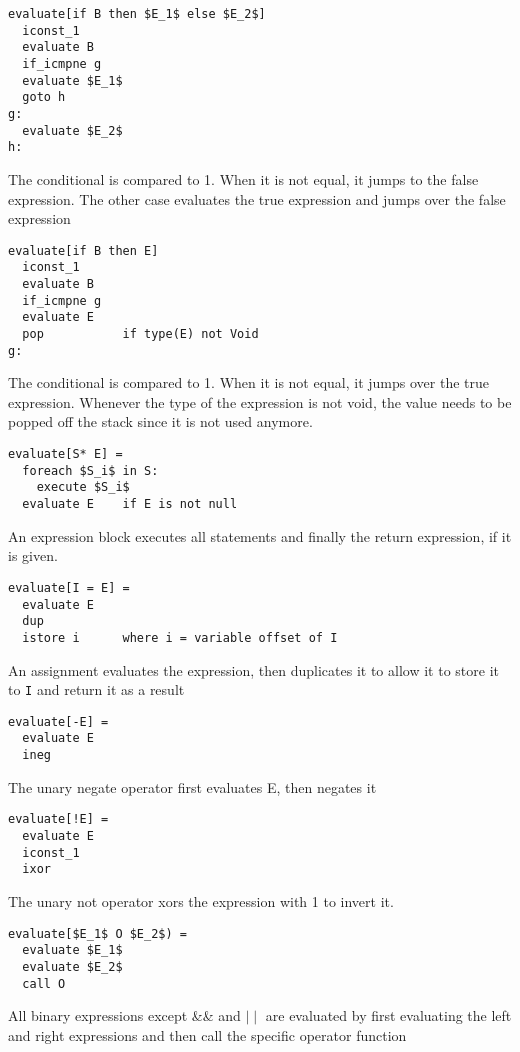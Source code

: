 \begin{lstlisting}
evaluate[if B then $E_1$ else $E_2$]
  iconst_1
  evaluate B
  if_icmpne	g
  evaluate $E_1$
  goto h
g:
  evaluate $E_2$
h:  
\end{lstlisting}

The conditional is compared to 1. When it is not equal, it jumps to the false expression. The other case evaluates the true expression and jumps over the false expression

\begin{lstlisting}
evaluate[if B then E]
  iconst_1
  evaluate B
  if_icmpne g
  evaluate E
  pop			if type(E) not Void
g:  
\end{lstlisting}

The conditional is compared to 1. When it is not equal, it jumps over the true expression. Whenever the type of the expression is not void, the value needs to be popped off the stack since it is not used anymore.

\begin{lstlisting}
evaluate[S* E] =
  foreach $S_i$ in S:
    execute $S_i$
  evaluate E    if E is not null
\end{lstlisting}
An expression block executes all statements and finally the return expression, if it is given.
 
\begin{lstlisting} 
evaluate[I = E] = 
  evaluate E
  dup
  istore i		where i = variable offset of I
\end{lstlisting}
An assignment evaluates the expression, then duplicates it to allow it to store it to \texttt{I} and return it as a result
  
\begin{lstlisting}  
evaluate[-E] =
  evaluate E
  ineg  
\end{lstlisting}
The unary negate operator first evaluates E, then negates it

\begin{lstlisting}  
evaluate[!E] =
  evaluate E
  iconst_1
  ixor
\end{lstlisting}
The unary not operator xors the expression with 1 to invert it.
  
\begin{lstlisting}  
evaluate[$E_1$ O $E_2$) =
  evaluate $E_1$
  evaluate $E_2$
  call O   
\end{lstlisting}
All binary expressions except \&\& and $\mid\mid$ are evaluated by first evaluating the left and right expressions and then call the specific operator function

